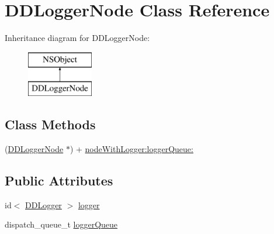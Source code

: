 \hypertarget{interface_d_d_logger_node}{\section{D\-D\-Logger\-Node Class Reference}
\label{interface_d_d_logger_node}
}
Inheritance diagram for D\-D\-Logger\-Node\-:\begin{figure}[H]
\begin{center}
\leavevmode
\includegraphics[height=2.000000cm]{interface_d_d_logger_node}
\end{center}
\end{figure}
\subsection*{Class Methods}
\begin{DoxyCompactItemize}
\item 
(\hyperlink{interface_d_d_logger_node}{D\-D\-Logger\-Node} $\ast$) + \hyperlink{interface_d_d_logger_node_ad4e358c429de9a4218f8924c263e1f4b}{node\-With\-Logger\-:logger\-Queue\-:}
\end{DoxyCompactItemize}
\subsection*{Public Attributes}
\begin{DoxyCompactItemize}
\item 
id$<$ \hyperlink{protocol_d_d_logger-p}{D\-D\-Logger} $>$ \hyperlink{interface_d_d_logger_node_a50d0ae09472bc9b48a215229369adc6d}{logger}
\item 
dispatch\-\_\-queue\-\_\-t \hyperlink{interface_d_d_logger_node_a119833ec5bacb1be5e17329701fa7bfd}{logger\-Queue}
\end{DoxyCompactItemize}


